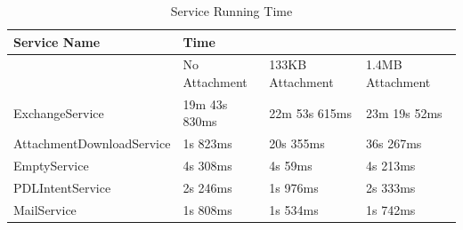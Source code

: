 \begin{table}[!h]
\centering
\caption{Service Running Time}
\label{my-label}
\begin{tabular}{|l|l|l|l|}
\hline
Service Name              & \multicolumn{3}{P{10cm}|}{Time}                           \\ \hline
                          & No Attachment & 133KB Attachment & 1.4MB Attachment \\ \hline
ExchangeService           & 19m 43s 830ms & 22m 53s 615ms    & 23m 19s 52ms     \\ \hline
AttachmentDownloadService & 1s 823ms      & 20s 355ms        & 36s 267ms        \\ \hline
EmptyService              & 4s 308ms      & 4s 59ms          & 4s 213ms         \\ \hline
PDLIntentService          & 2s 246ms      & 1s 976ms         & 2s 333ms         \\ \hline
MailService               & 1s 808ms      & 1s 534ms         & 1s 742ms         \\ \hline
\end{tabular}
\end{table}


